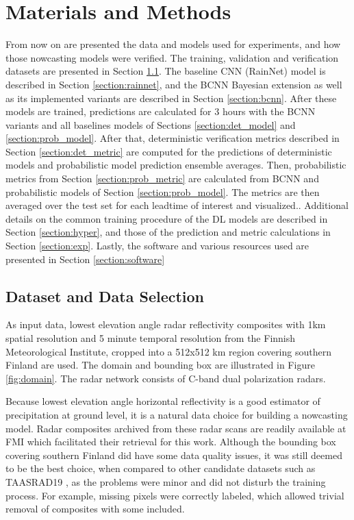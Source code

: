 \chapter{Materials and Methods}
\label{chapter:methods}

From now on are presented the data and models used for experiments, and how those nowcasting models were verified. The training, validation and verification datasets are presented in Section \ref{section:data}. The baseline CNN (RainNet) model is described in Section \ref{section:rainnet}, and the BCNN Bayesian extension as well as its implemented variants are described in Section \ref{section:bcnn}. After these models are trained, predictions are calculated for 3 hours with the BCNN variants and all baselines models of Sections \ref{section:det_model} and \ref{section:prob_model}. After that, deterministic verification metrics described in Section \ref{section:det_metric} are computed for the predictions of deterministic models and probabilistic model prediction ensemble averages. Then, probabilistic metrics from Section \ref{section:prob_metric} are calculated from BCNN and probabilistic models of Section \ref{section:prob_model}. The metrics are then averaged over the test set for each leadtime of interest and visualized.. Additional details on the common training procedure of the DL models are described in Section \ref{section:hyper}, and those of the prediction and metric calculations in Section \ref{section:exp}. Lastly, the software and various resources used are presented in Section \ref{section:software}


\section{Dataset and Data Selection}
\label{section:data}

As input data, lowest elevation angle radar reflectivity composites with 1km spatial resolution and 5 minute temporal resolution from the Finnish Meteorological Institute, cropped into a 512x512 km region covering southern Finland are used. The domain and bounding box are illustrated in Figure \ref{fig:domain}. The radar network consists of C-band dual polarization radars. 

Because lowest elevation angle horizontal reflectivity is a good estimator of precipitation at ground level, it is a natural data choice for building a nowcasting model. Radar composites archived from these radar scans are readily available at FMI which facilitated their retrieval for this work. Although the bounding box covering southern Finland did have some data quality issues, it was still deemed to be the best choice, when compared to other candidate datasets such as TAASRAD19 \cite{franch_taasrad19_2020}, as the problems were minor and did not disturb the training process. For example, missing pixels were correctly labeled, which allowed trivial removal of composites with some included. 

